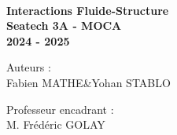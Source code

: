 \documentclass{article}
\numberwithin{figure}{section}
\numberwithin{table}{section}
\newcommand{\sujet}{Interactions Fluide-Structure}
\newcommand{\sujets}{Seatech 3A - MOCA}
\newcommand{\auteur}{Fabien MATHE}
\newcommand{\auteurs}{Yohan STABLO}
\newcommand{\referent}{M. Frédéric GOLAY}
\begin{document}
\begin{titlepage}
    \makebox[0.8\linewidth]{\hrulefill}\\[0.2cm]
    
    \vspace{2cm}
    
    \large{\Large \textbf{\sujet}}\\
    \large{\textbf{\sujets}}\\

    \vspace{0.5cm}
    \large{\textbf{2024 - 2025}}

    
    \vspace{1cm}
    
    {
    \centering
        Auteurs : \\
        \auteur\;\&\;\auteurs

        \vspace{0.8 cm}

        Professeur encadrant : \\
        \referent

    }
    
\end{titlepage}
\ClearShipoutPictureBG
\newpage

\renewcommand{\thepage}{}

\renewcommand{\thepage}{\arabic{page}}
\renewcommand{\thesection}{\Roman{section}}

% 



\vfill
\tableofcontents
\vfill
\end{document}
